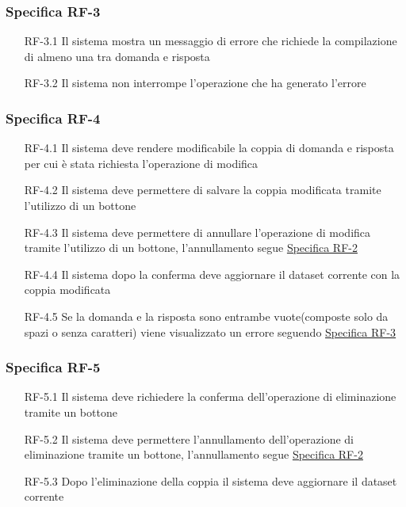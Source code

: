 \subsubsection{Specifica RF-3}
\label{subsubsec:RF-3}
\begin{enumerate}
    \item[RF-3.1] Il sistema mostra un messaggio di errore che richiede la compilazione di almeno una tra domanda e risposta
    \item[RF-3.2] Il sistema non interrompe l'operazione che ha generato l'errore 
\end{enumerate}

\subsubsection{Specifica RF-4}
\label{subsubsec:RF-4}
\begin{enumerate}
    \item[RF-4.1] Il sistema deve rendere modificabile la coppia di domanda e risposta per cui è stata richiesta l'operazione di modifica
    \item[RF-4.2] Il sistema deve permettere di salvare la coppia modificata tramite l'utilizzo di un bottone
    \item[RF-4.3] Il sistema deve permettere di annullare l'operazione di modifica tramite l'utilizzo di un bottone, l'annullamento segue \hyperref[subsubsec:RF-2]{Specifica RF-2}
    \item[RF-4.4] Il sistema dopo la conferma deve aggiornare il dataset corrente con la coppia modificata
    \item[RF-4.5] Se la domanda e la risposta sono entrambe vuote(composte solo da spazi o senza caratteri) viene visualizzato un errore seguendo \hyperref[subsubsec:RF-3]{Specifica RF-3}
\end{enumerate}

\subsubsection{Specifica RF-5}
\label{subsubsec:RF-5}
\begin{enumerate}
    \item[RF-5.1] Il sistema deve richiedere la conferma dell'operazione di eliminazione tramite un bottone
    \item[RF-5.2] Il sistema deve permettere l'annullamento dell'operazione di eliminazione tramite un bottone, l'annullamento segue \hyperref[subsubsec:RF-2]{Specifica RF-2}
    \item[RF-5.3] Dopo l'eliminazione della coppia il sistema deve aggiornare il dataset corrente
\end{enumerate}

